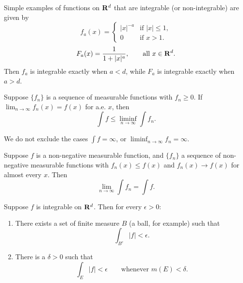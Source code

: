 \begin{example}
  Simple examples of functions on $\mathbf{R}^d$ that are integrable
  (or non-integrable) are given by
  \begin{equation}
    f_a(x) =
    \begin{cases}
      |x|^{-a} & \text{if } |x| \le 1, \\
      0        & \text{if } x > 1.
    \end{cases}
  \end{equation}
  \begin{equation}
    F_a(x) = \frac{1}{1 + |x|^a}, \qquad \text{all } x \in \mathbf{R}^d.
  \end{equation}
  Then $f_a$ is integrable exactly when $a < d$, while $F_a$ is integrable
  exactly when $a > d$.
\end{example}

\begin{lemma}[Fatou]
  Suppose $\{f_n\}$ is a sequence of measurable functions with $f_n \geq 0$.
  If $\lim_{n \to \infty} f_n(x) = f(x)$ for a.e. $x$, then
  \begin{equation}
    \int f \le \liminf_{n \to \infty} \int f_n.
  \end{equation}
\end{lemma}

\begin{remark}
  We do not exclude the cases $\int f = \infty$,
  or $\liminf_{n \to \infty} f_n = \infty$.
\end{remark}

\begin{corollary}
  Suppose $f$ is a non-negative measurable function, and $\{f_n\}$ a sequence
  of non-negative measurable functions with
  $f_n(x) \le f(x)$ and $f_n(x) \to f(x)$ for almost every $x$. Then
  \begin{equation}
    \lim_{n \to \infty} \int f_n = \int f.
  \end{equation}
\end{corollary}

\begin{proposition}
  Suppose $f$ is integrable on $\mathbf{R}^d$. Then for every $\epsilon > 0$:
  \begin{enumerate}
    \renewcommand{\theenumi}{\roman{enumi}}
    \item There exists a set of finite measure $B$ (a ball, for example) such
      that
      \begin{equation}
        \int_{B^c} |f| < \epsilon.
      \end{equation}
    \item There is a $\delta > 0$ such that
      \begin{equation}
        \int_E |f| < \epsilon \qquad \text{whenever } m(E) < \delta.
      \end{equation}
  \end{enumerate}
\end{proposition}

